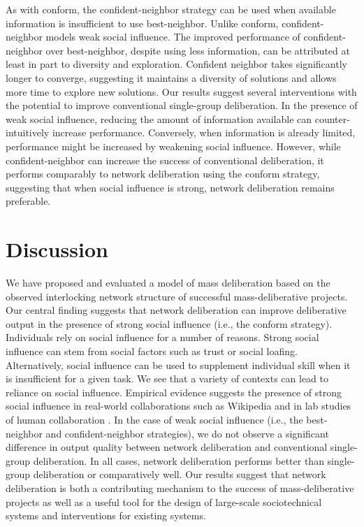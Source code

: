 As with conform, the confident-neighbor strategy can be used when available information is insufficient to use best-neighbor. Unlike conform, confident-neighbor models weak social influence. The improved performance of confident-neighbor over best-neighbor, despite using less information, can be attributed at least in part to diversity and exploration. Confident neighbor takes significantly longer to converge, suggesting it maintains a diversity of solutions and allows more time to explore new solutions. Our results suggest several interventions with the potential to improve conventional single-group deliberation. In the presence of weak social influence, reducing the amount of information available can counter-intuitively increase performance. Conversely, when information is already limited, performance might be increased by weakening social influence. However, while confident-neighbor can increase the success of conventional deliberation, it performs comparably to network deliberation using the conform strategy, suggesting that when social influence is strong, network deliberation remains preferable.

\section{Discussion}

We have proposed and evaluated a model of mass deliberation based on the observed interlocking network structure of successful mass-deliberative projects.
Our central finding suggests that network deliberation can improve deliberative output in the presence of strong social influence (i.e., the conform strategy).
Individuals rely on social influence for a number of reasons.
Strong social influence can stem from social factors such as trust or social loafing.
Alternatively, social influence can be used to supplement individual skill when it is insufficient for a given task.
We see that a variety of contexts can lead to reliance on social influence.
Empirical evidence suggests the presence of strong social influence in real-world collaborations such as Wikipedia \cite{platt_network_2018} and in lab studies of human collaboration \cite{mason_collaborative_2012, barkoczi_social_2016}.
In the case of weak social influence (i.e., the  best-neighbor and confident-neighbor strategies), we do not observe a significant difference in output quality between network deliberation and conventional single-group deliberation. In all cases, network deliberation performs better than single-group deliberation or comparatively well. 
Our results suggest that network deliberation is both a contributing mechanism to the success of mass-deliberative projects as well as a useful tool for the design of large-scale sociotechnical systems and interventions for existing systems.


